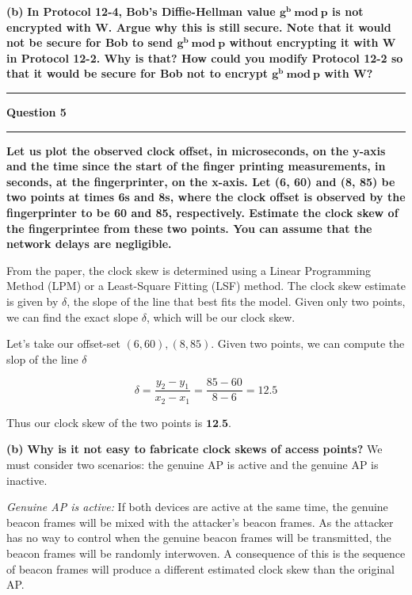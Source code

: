 \documentclass[11pt]{article}
\newcommand\question[2]{\vspace{.25in}\hrule\textbf{#1}\vspace{.5em}\hrule\vspace{.10in}}
\renewcommand\part[1]{\vspace{.10in}\textbf{(#1)}}
\begin{document}
\part{b} \textbf{In Protocol 12-4, Bob's Diffie-Hellman value $\mathbf{g^b \ mod \ p}$ is not encrypted with W. Argue why this is still secure. Note that it would not be secure for Bob to send $\mathbf{g^b \ mod \ p}$ without encrypting it with W in Protocol 12-2. Why is that? How could you modify Protocol 12-2 so that it would be secure for Bob not to encrypt $\mathbf{g^b \ mod \ p}$ with W?}



\question{Question 5}

\part{a} \textbf{Let us plot the observed clock offset, in microseconds, on the y-axis and the time since the start of the finger printing measurements, in seconds, at the fingerprinter, on the x-axis. Let (6, 60) and (8, 85) be two points at times 6s and 8s, where the clock offset is observed by the fingerprinter to be 60 and 85, respectively. Estimate the clock skew of the fingerprintee from these two points. You can assume that the network delays are negligible.} 

From the paper, the clock skew is determined using a Linear Programming Method (LPM) or a Least-Square Fitting (LSF) method. The clock skew estimate is given by $\delta$, the slope of the line that best fits the model. Given only two points, we can find the exact slope $\delta$, which will be our clock skew.

Let's take our offset-set $(6, 60), (8, 85)$. Given two points, we can compute the slop of the line $\delta$

$$\delta = \frac{y_2 - y_1}{x_2 - x_1} = \frac{85 - 60}{8 - 6} = 12.5$$

Thus our clock skew of the two points is $\textbf{12.5}$.

\part{b} \textbf{Why is it not easy to fabricate clock skews of access points?}
We must consider two scenarios: the genuine AP is active and the genuine AP is inactive.

\textit{Genuine AP is active:} If both devices are active at the same time, the genuine beacon frames will be mixed with the attacker's beacon frames. As the attacker has no way to control when the genuine beacon frames will be transmitted, the beacon frames will be randomly interwoven. A consequence of this is the sequence of beacon frames will produce a different estimated clock skew than the original AP.
\end{document}
